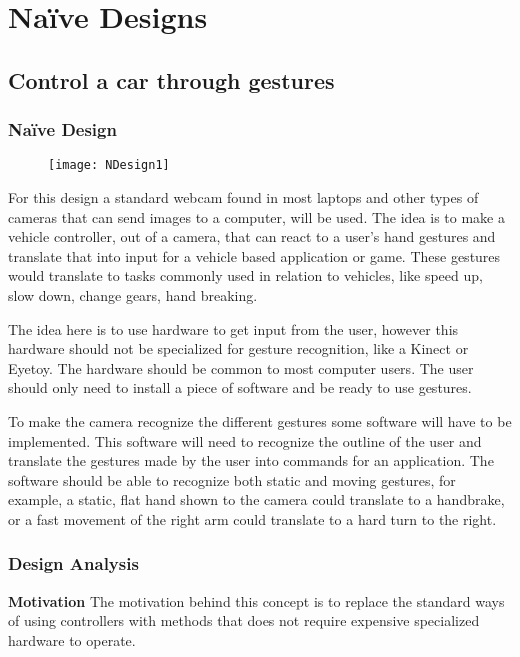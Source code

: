 \appendix
\appendixpage
\addappheadtotoc

\section{Naïve Designs} \label{NaiveDesigns}

\subsection{Control a car through gestures} \label{nd1}
\subsubsection*{Naïve Design}

\begin{figure}[h]
\centering
\texttt{[image: NDesign1]}
\caption{}
\label{fig:ndesign1}
\end{figure}

For this design a standard webcam found in most laptops and other types of cameras that can send images to a computer, will be used. The idea is to make a vehicle controller, out of a camera, that can react to a user’s hand gestures and translate that into input for a vehicle based application or game. These gestures would translate to tasks commonly used in relation to vehicles, like speed up, slow down, change gears, hand breaking.


The idea here is to use hardware to get input from the user, however this hardware should not be specialized for gesture recognition, like a Kinect or Eyetoy. The hardware should be common to most computer users. The user should only need to install a piece of software and be ready to use gestures.


To make the camera recognize the different gestures some software will have to be implemented. This software will need to recognize the outline of the user and translate the gestures made by the user into commands for an application. The software should be able to recognize both static and moving gestures, for example, a static, flat hand shown to the camera could translate to a handbrake, or a fast movement of the right arm could translate to a hard turn to the right.

\subsubsection*{Design Analysis}
\noindent\textbf{Motivation} \newline
The motivation behind this concept is to replace the standard ways of using controllers with methods that does not require expensive specialized hardware to operate.


